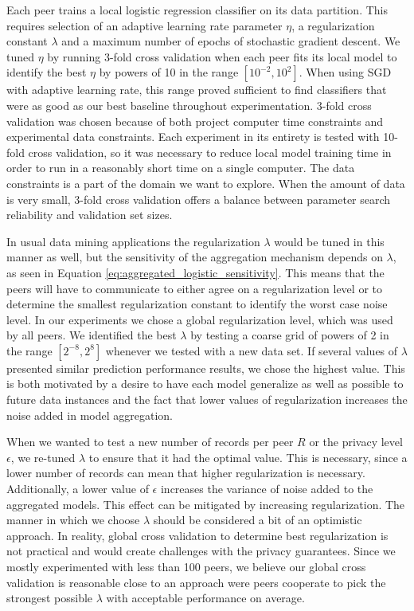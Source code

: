 Each peer trains a local logistic regression classifier on its data partition. This requires selection of an adaptive learning rate parameter $\eta$, a regularization constant $\lambda$ and a maximum number of epochs of stochastic gradient descent. We tuned $\eta$ by running 3-fold cross validation when each peer fits its local model to identify the best $\eta$ by powers of 10 in the range $[10^{-2}, 10^{2}]$. When using SGD with adaptive learning rate, this range proved sufficient to find classifiers that were as good as our best baseline throughout experimentation. 3-fold cross validation was chosen because of both project computer time constraints and experimental data constraints. Each experiment in its entirety is tested with 10-fold cross validation, so it was necessary to reduce local model training time in order to run in a reasonably short time on a single computer. The data constraints is a part of the domain we want to explore. When the amount of data is very small, 3-fold cross validation offers a balance between parameter search reliability and validation set sizes.

In usual data mining applications the regularization $\lambda$ would be tuned in this manner as well, but the sensitivity of the aggregation mechanism depends on $\lambda$, as seen in Equation \ref{eq:aggregated_logistic_sensitivity}. This means that the peers will have to communicate to either agree on a regularization level or to determine the smallest regularization constant to identify the worst case noise level. In our experiments we chose a global regularization level, which was used by all peers. We identified the best $\lambda$ by testing a coarse grid of powers of 2 in the range $[2^{-8}, 2^{8}]$ whenever we tested with a new data set. If several values of $\lambda$ presented similar prediction performance results, we chose the highest value. This is both motivated by a desire to have each model generalize as well as possible to future data instances and the fact that lower values of regularization increases the noise added in model aggregation.

When we wanted to test a new number of records per peer $R$ or the privacy level $\epsilon$, we re-tuned $\lambda$ to ensure that it had the optimal value. This is necessary, since a lower number of records can mean that higher regularization is necessary. Additionally, a lower value of $\epsilon$ increases the variance of noise added to the aggregated models. This effect can be mitigated by increasing regularization.  The manner in which we choose $\lambda$ should be considered a bit of an optimistic approach. In reality, global cross validation to determine best regularization is not practical and would create challenges with the privacy guarantees. Since we mostly experimented with less than 100 peers, we believe our global cross validation is reasonable close to an approach were peers cooperate to pick the strongest possible $\lambda$ with acceptable performance on average.

